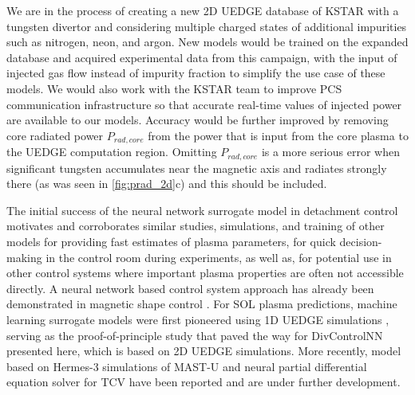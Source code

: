 We are in the process of creating a new 2D UEDGE database of KSTAR with a tungsten divertor and considering multiple charged states of additional impurities such as nitrogen, neon, and argon.
New models would be trained on the expanded database and acquired experimental data from this campaign, with the input of injected gas flow instead of impurity fraction to simplify the use case of these models.
We would also work with the KSTAR team to improve PCS communication infrastructure so that accurate real-time values of injected power are available to our models.
Accuracy would be further improved by removing core radiated power $P_{rad,core}$ from the power that is input from the core plasma to the UEDGE computation region.
Omitting $P_{rad,core}$ is a more serious error when significant tungsten accumulates near the magnetic axis and radiates strongly there (as was seen in \ref{fig:prad_2d}c) and this should be included.

The initial success of the neural network surrogate model in detachment control motivates and corroborates similar studies, simulations, and training of other models for providing fast estimates of plasma parameters, for quick decision-making in the control room during experiments, as well as, for potential use in other control systems where important plasma properties are often not accessible directly.
A neural network based control system approach has already been demonstrated in magnetic shape control \cite{Degrave_2022_Nature}.
For \ac{SOL} plasma predictions, machine learning surrogate models were first pioneered using 1D UEDGE simulations \cite{Zhu_2022_JPP}, serving as the proof-of-principle study that paved the way for DivControlNN presented here, which is based on 2D UEDGE simulations.
More recently, model based on Hermes-3 \cite{Dudson_2024_CPC} simulations of MAST-U \cite{Holt_2024_NF} and neural partial differential equation solver for TCV \cite{Poels_2023_NF} have been reported and are under further development.

